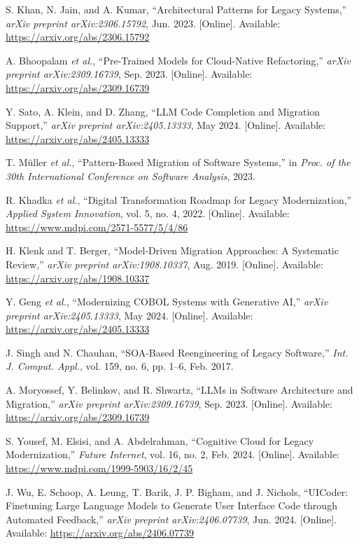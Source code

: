 \documentclass[12pt]{article}
\begin{document}
\begin{thebibliography}{99}
S. Khan, N. Jain, and A. Kumar, “Architectural Patterns for Legacy Systems,” \textit{arXiv preprint arXiv:2306.15792}, Jun. 2023. [Online]. Available: \url{https://arxiv.org/abs/2306.15792}

A. Bhoopalam \textit{et al.}, “Pre-Trained Models for Cloud-Native Refactoring,” \textit{arXiv preprint arXiv:2309.16739}, Sep. 2023. [Online]. Available: \url{https://arxiv.org/abs/2309.16739}

Y. Sato, A. Klein, and D. Zhang, “LLM Code Completion and Migration Support,” \textit{arXiv preprint arXiv:2405.13333}, May 2024. [Online]. Available: \url{https://arxiv.org/abs/2405.13333}

T. Müller \textit{et al.}, “Pattern-Based Migration of Software Systems,” in \textit{Proc. of the 30th International Conference on Software Analysis}, 2023.

R. Khadka \textit{et al.}, “Digital Transformation Roadmap for Legacy Modernization,” \textit{Applied System Innovation}, vol. 5, no. 4, 2022. [Online]. Available: \url{https://www.mdpi.com/2571-5577/5/4/86}

H. Klenk and T. Berger, “Model-Driven Migration Approaches: A Systematic Review,” \textit{arXiv preprint arXiv:1908.10337}, Aug. 2019. [Online]. Available: \url{https://arxiv.org/abs/1908.10337}

Y. Geng \textit{et al.}, “Modernizing COBOL Systems with Generative AI,” \textit{arXiv preprint arXiv:2405.13333}, May 2024. [Online]. Available: \url{https://arxiv.org/abs/2405.13333}

J. Singh and N. Chauhan, “SOA-Based Reengineering of Legacy Software,” \textit{Int. J. Comput. Appl.}, vol. 159, no. 6, pp. 1–6, Feb. 2017.

A. Moryossef, Y. Belinkov, and R. Shwartz, “LLMs in Software Architecture and Migration,” \textit{arXiv preprint arXiv:2309.16739}, Sep. 2023. [Online]. Available: \url{https://arxiv.org/abs/2309.16739}

S. Yousef, M. Elsisi, and A. Abdelrahman, “Cognitive Cloud for Legacy Modernization,” \textit{Future Internet}, vol. 16, no. 2, Feb. 2024. [Online]. Available: \url{https://www.mdpi.com/1999-5903/16/2/45}

J. Wu, E. Schoop, A. Leung, T. Barik, J. P. Bigham, and J. Nichols, “UICoder: Finetuning Large Language Models to Generate User Interface Code through Automated Feedback,” \textit{arXiv preprint arXiv:2406.07739}, Jun. 2024. [Online]. Available: \url{https://arxiv.org/abs/2406.07739}


\end{thebibliography}
\end{document}

